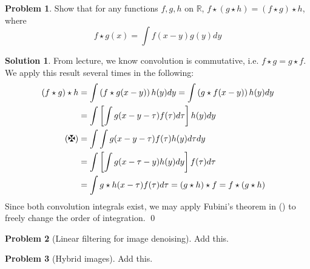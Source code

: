 \documentclass[10pt]{article}
\theoremstyle{plain}
\theoremstyle{definition}
\newtheorem{prob}{Problem}
\newtheorem*{soln*}{Solution}
\providecommand{\R}{\mathbb{R}}%
\numberwithin{equation}{section}
\begin{document}
\hrulefill

\begin{prob}
Show that for any functions $f,g,h$ on $\R$, $f\star (g \star h) = (f\star g) \star h$, where
\[
        f \star g(x) = \int f(x-y) g(y) dy
    \]
\end{prob}

\begin{soln*}
    From lecture, we know convolution is commutative, i.e. $f\star g = g \star f$.
    We apply this result several times in the following:
    \begin{align*}
        (f \star g ) \star h
        &= \int \left(f \star g(x-y)\right) h(y) dy = \int \left(g \star f(x-y)\right) h(y) dy \\
        &= \int \left[ \int g(x-y-\tau) f(\tau) d\tau \right] h(y) dy \\ \tag{\textbf{\maltese}}
        &= \int \int g(x-y-\tau) f(\tau) h(y) d\tau dy \\ 
        &= \int \left[ \int g(x-\tau-y) h(y) dy \right]f(\tau) d\tau  \\
        &= \int g\star h(x-\tau) f(\tau) d\tau = (g \star h) \star f = f \star (g \star h)
    \end{align*}
    Since both convolution integrals exist, we may apply Fubini's theorem in
    (\textbf{\maltese}) to freely change the order of integration.
    \qed
\end{soln*}

\hrulefill

\begin{prob}[Linear filtering for image denoising]
    Add this.
\end{prob}

\hrulefill
\begin{prob}[Hybrid images]
    Add this.
\end{prob}
\end{document}
